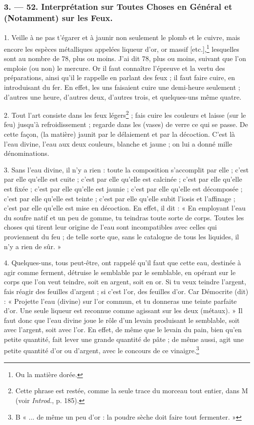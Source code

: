 \documentclass[landscape, a4paper, 11pt, oneside, polutonikogreek, french]{article}
\begin{document}
\subsubsection{3. --- 52. Interprétation sur Toutes Choses en Général et (Notamment) sur les Feux.}
\paragraph{}
1. Veille à ne pas t'égarer et à jaunir non seulement le plomb et le cuivre, mais encore les espèces métalliques appelées liqueur d'or, or massif [etc.],\footnote{Ou la matière dorée.} lesquelles sont au nombre de 78, plus ou moins. J'ai dit 78, plus ou moins, suivant que l'on emploie (ou non) le mercure. Or il faut connaître l'épreuve et la vertu des préparations, ainsi qu'il le rappelle en parlant des feux ; il faut faire cuire, en introduisant du fer. En effet, les uns faisaient cuire une demi-heure seulement ; d'autres une heure, d'autres deux, d'autres trois, et quelques-uns même quatre.

2. Tout l'art consiste dans les feux légers\footnote{Cette phrase est restée, comme la seule trace du morceau tout entier, dans M (voir \emph{Introd.}, p. 185).} ; fais cuire les couleurs et laisse (sur le feu) jusqu'à refroidissement ; regarde dans les (vases) de verre ce qui se passe. De cette façon, (la matière) jaunit par le délaiement et par la décoction. C'est là l'eau divine, l'eau aux deux couleurs, blanche et jaune ; on lui a donné mille dénominations.

3. Sans l'eau divine, il n'y a rien : toute la composition s'accomplit par elle ; c'est par elle qu'elle est cuite ; c'est par elle qu'elle est calcinée ; c'est par elle qu'elle est fixée ; c'est par elle qu'elle est jaunie ; c'est par elle qu'elle est décomposée ; c'est par elle qu'elle est teinte ; c'est par elle qu'elle subit l'iosis et l'affinage ; c'est par elle qu'elle est mise en décoction. En effet, il dit : « En employant l'eau du soufre natif et un peu de gomme, tu teindras toute sorte de corps. Toutes les choses qui tirent leur origine de l'eau sont incompatibles avec celles qui proviennent du feu ; de telle sorte que, sans le catalogue de tous les liquides, il n'y a rien de sûr. »

4. Quelques-uns, tous peut-être, ont rappelé qu'il faut que cette eau, destinée à agir comme ferment, détruise le semblable par le semblable, en opérant sur le corps que l'on veut teindre, soit en argent, soit en or. Si tu veux teindre l'argent, fais réagir des feuilles d'argent ; si c'est l'or, des feuilles d'or. Car Démocrite (dit) : « Projette l'eau (divine) sur l'or commun, et tu donneras une teinte parfaite d'or. Une seule liqueur est reconnue comme agissant sur les deux (métaux). » Il faut donc que l'eau divine joue le rôle d'un levain produisant le semblable, soit avec l'argent, soit avec l'or. En effet, de même que le levain du pain, bien qu'en petite quantité, fait lever une grande quantité de pâte ; de même aussi, agit une petite quantité d'or ou d'argent, avec le concours de ce vinaigre.\footnote{B « ... de même un peu d'or : la poudre sèche doit faire tout fermenter. »}
\end{document}
